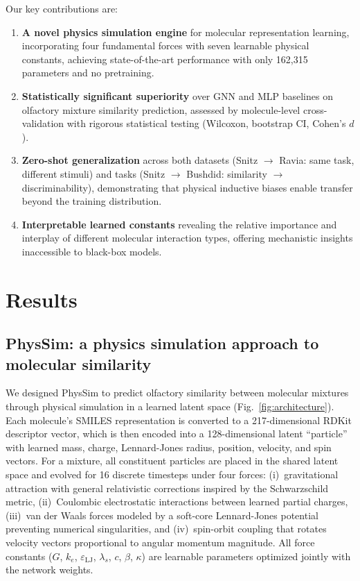 \documentclass[11pt,a4paper]{article}
\begin{document}
Our key contributions are:
\begin{enumerate}
    \item \textbf{A novel physics simulation engine} for molecular representation learning, incorporating four fundamental forces with seven learnable physical constants, achieving state-of-the-art performance with only 162,315 parameters and no pretraining.
    \item \textbf{Statistically significant superiority} over GNN and MLP baselines on olfactory mixture similarity prediction, assessed by molecule-level cross-validation with rigorous statistical testing (Wilcoxon, bootstrap CI, Cohen's $d$).
    \item \textbf{Zero-shot generalization} across both datasets (Snitz $\to$ Ravia: same task, different stimuli) and tasks (Snitz $\to$ Bushdid: similarity $\to$ discriminability), demonstrating that physical inductive biases enable transfer beyond the training distribution.
    \item \textbf{Interpretable learned constants} revealing the relative importance and interplay of different molecular interaction types, offering mechanistic insights inaccessible to black-box models.
\end{enumerate}

\section{Results}

\subsection{PhysSim: a physics simulation approach to molecular similarity}

We designed PhysSim to predict olfactory similarity between molecular mixtures through physical simulation in a learned latent space (Fig.~\ref{fig:architecture}). Each molecule's SMILES representation is converted to a 217-dimensional RDKit descriptor vector, which is then encoded into a 128-dimensional latent ``particle'' with learned mass, charge, Lennard-Jones radius, position, velocity, and spin vectors. For a mixture, all constituent particles are placed in the shared latent space and evolved for 16 discrete timesteps under four forces: (i)~gravitational attraction with general relativistic corrections inspired by the Schwarzschild metric, (ii)~Coulombic electrostatic interactions between learned partial charges, (iii)~van der Waals forces modeled by a soft-core Lennard-Jones potential preventing numerical singularities, and (iv)~spin-orbit coupling that rotates velocity vectors proportional to angular momentum magnitude. All force constants ($G$, $k_e$, $\varepsilon_{\text{LJ}}$, $\lambda_s$, $c$, $\beta$, $\kappa$) are learnable parameters optimized jointly with the network weights.
\end{document}
